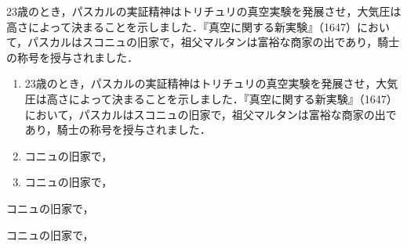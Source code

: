 \item[問題1] 23歳のとき，パスカルの実証精神はトリチュリの真空実験を発展させ，大気圧は高さによって決まることを示しました．『真空に関する新実験』（1647）において，パスカルはスコニュの旧家で，祖父マルタンは富裕な商家の出であり，騎士の称号を授与されました．
\begin{enumerate}
\item 23歳のとき，パスカルの実証精神はトリチュリの真空実験を発展させ，大気圧は高さによって決まることを示しました．『真空に関する新実験』（1647）において，パスカルはスコニュの旧家で，祖父マルタンは富裕な商家の出であり，騎士の称号を授与されました．
\item コニュの旧家で，
\item コニュの旧家で，
\end{enumerate}
\item[問題2] コニュの旧家で，
\item[問題3] コニュの旧家で，
